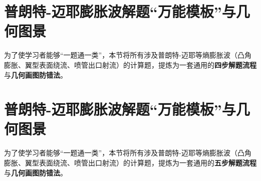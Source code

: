 \documentclass[11pt,a4paper]{ctexart}
\begin{document}
\newpage

\section{普朗特-迈耶膨胀波解题“万能模板”与几何图景}
为了使学习者能够“一题通一类”，本节将所有涉及普朗特-迈耶等熵膨胀波（凸角膨胀、翼型表面绕流、喷管出口射流）的计算题，提炼为一套通用的\textbf{四步解题流程}与\textbf{几何画图防错法}。

\section{普朗特-迈耶膨胀波解题“万能模板”与几何图景}
为了使学习者能够“一题通一类”，本节将所有涉及普朗特-迈耶等熵膨胀波（凸角膨胀、翼型表面绕流、喷管出口射流）的计算题，提炼为一套通用的\textbf{五步解题流程}与\textbf{几何画图防错法}。
\end{document}
